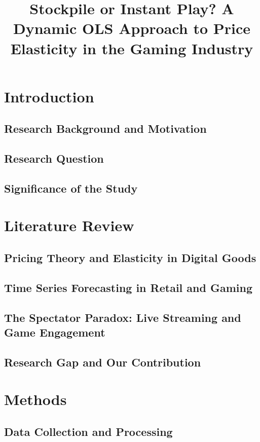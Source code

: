 \documentclass[stu, 12pt, a4paper]{apa7}
\title{Stockpile or Instant Play? A Dynamic OLS Approach to Price Elasticity in the Gaming Industry}
\begin{document}
\maketitle

\section{Introduction}
\subsection{Research Background and Motivation}
\subsection{Research Question}
\subsection{Significance of the Study}

\section{Literature Review}
\subsection{Pricing Theory and Elasticity in Digital Goods}
\subsection{Time Series Forecasting in Retail and Gaming}
\subsection{The Spectator Paradox: Live Streaming and Game Engagement}
\subsection{Research Gap and Our Contribution}

\section{Methods}
\subsection{Data Collection and Processing}
\end{document}

